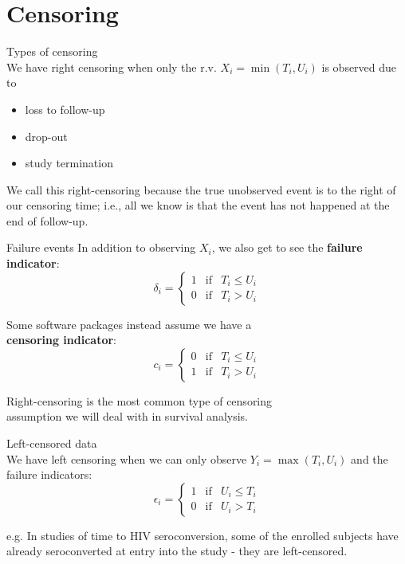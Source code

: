 \documentclass[envcountsect, 10pt, portrait, palatino]{beamer}
\begin{document}
\section{Censoring}
\begin{frame}{Types of censoring}
\\[3ex]
We have right censoring when only the r.v. $X_i=\min(T_i,U_i)$ is observed due to
\begin{itemize}
\item loss to follow-up
\item drop-out
\item study termination
\end{itemize}
We call this right-censoring because the true unobserved event
is to the right of our censoring time; i.e., all we know is
that the event has not happened at the end of follow-up.
\end{frame}
\begin{frame}{Failure events}
In addition to observing $X_i$, we also get to see the {\bf failure indicator}:
\[\delta_i=\left\{\begin{array}{ccc}
1 & \mbox{if} & T_i\le U_i \\
0 & \mbox{if} & T_i>U_i \end{array} \right. \]

Some software packages instead assume we have a \\
{\bf censoring indicator}:
\[c_i=\left\{\begin{array}{ccc}
0 & \mbox{if} & T_i\le U_i \\
1 & \mbox{if} & T_i>U_i \end{array} \right. \]

\vspace{0.3in}
Right-censoring is the most common type of censoring \\
assumption we will deal with in survival analysis.
\end{frame}
\begin{frame}{Left-censored data}
\\[3ex]
We have left censoring when we can only observe $Y_i=\max(T_i,U_i)$ and the failure indicators:
\[\epsilon_i=\left\{\begin{array}{ccc}
1 & \mbox{if} & U_i\le T_i \\
0 & \mbox{if} & U_i>T_i \end{array} \right. \]

\vspace{0.2in}
e.g. In studies of time to HIV seroconversion, some of the enrolled
subjects have already seroconverted at entry into the study - they are
left-censored.

\end{frame}
\end{document}
